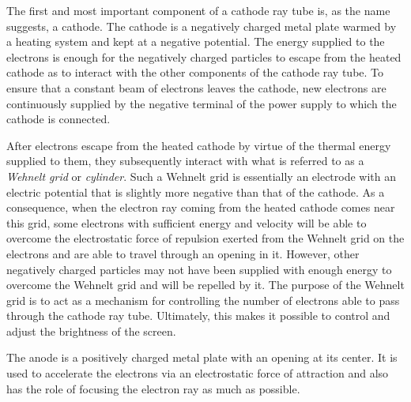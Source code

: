\begin{itemize}


	The first and most important component of a cathode ray tube is, as the name suggests, a cathode. The cathode is a negatively charged metal plate warmed by a heating system and kept at a negative potential. The energy supplied to the electrons is enough for the negatively charged particles to escape from the heated cathode as to interact with the other components of the cathode ray tube. To ensure that a constant beam of electrons leaves the cathode, new electrons are continuously supplied by the negative terminal of the power supply to which the cathode is connected.


	After electrons escape from the heated cathode by virtue of the thermal energy supplied to them, they subsequently interact with what is referred to as a \emph{Wehnelt grid} or \emph{cylinder}. Such a Wehnelt grid is essentially an electrode with an electric potential that is slightly more negative than that of the cathode. As a consequence, when the electron ray coming from the heated cathode comes near this grid, some electrons with sufficient energy and velocity will be able to overcome the electrostatic force of repulsion exerted from the Wehnelt grid on the electrons and are able to travel through an opening in it. However, other negatively charged particles may not have been supplied with enough energy to overcome the Wehnelt grid and will be repelled by it. The purpose of the Wehnelt grid is to act as a mechanism for controlling the number of electrons able to pass through the cathode ray tube. Ultimately, this makes it possible to control and adjust the brightness of the screen.


	The anode is a positively charged metal plate with an opening at its center. It is used to accelerate the electrons via an electrostatic force of attraction and also has the role of focusing the electron ray as much as possible.



\end{itemize}
